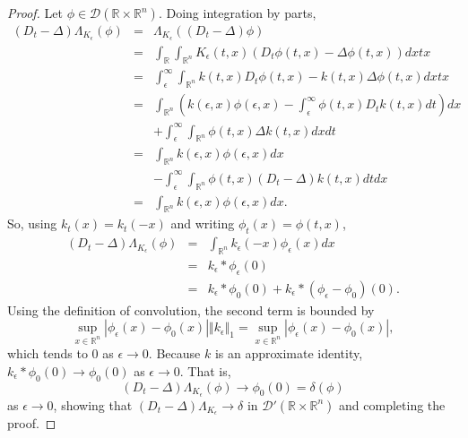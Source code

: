\documentclass{article}
\newcommand{\norm}[1]{\Vert #1 \Vert}
\begin{document}
\begin{proof}
Let $\phi \in \mathscr{D}(\mathbb{R} \times \mathbb{R}^n)$. Doing integration by parts,
\begin{eqnarray*}
(D_t-\Delta)\Lambda_{K_\epsilon}(\phi)&=&\Lambda_{K_\epsilon}\left( (D_t-\Delta) \phi\right)\\
&=&\int_{\mathbb{R}} \int_{\mathbb{R}^n} K_\epsilon(t,x)(D_t \phi(t,x) -\Delta \phi(t,x)) dxtx\\
&=&\int_\epsilon^\infty \int_{\mathbb{R}^n} k(t,x) D_t \phi(t,x) - k(t,x) \Delta \phi(t,x) dxtx\\
&=& \int_{\mathbb{R}^n} \left(k(\epsilon,x)\phi(\epsilon,x)- \int_\epsilon^\infty \phi(t,x) D_t k(t,x)  dt \right) dx  \\
&&+ \int_\epsilon^\infty \int_{\mathbb{R}^n}\phi(t,x) \Delta k(t,x) dx dt\\
&=&\int_{\mathbb{R}^n} k(\epsilon,x)\phi(\epsilon,x) dx \\
&&-\int_\epsilon^\infty  \int_{\mathbb{R}^n} \phi(t,x) (D_t-\Delta)k(t,x) dt dx\\
&=&\int_{\mathbb{R}^n} k(\epsilon,x)\phi(\epsilon,x) dx.
\end{eqnarray*}
So, using $k_t(x)=k_t(-x)$ and writing $\phi_t(x)=\phi(t,x)$,
\begin{eqnarray*}
(D_t-\Delta)\Lambda_{K_\epsilon}(\phi)&=&\int_{\mathbb{R}^n} k_\epsilon(-x) \phi_\epsilon(x) dx\\
&=&k_\epsilon * \phi_\epsilon (0)\\
&=& k_\epsilon * \phi_0 (0) + k_\epsilon*(\phi_\epsilon-\phi_0)(0).
\end{eqnarray*}
Using the definition of convolution, the second term is bounded by
\[
\sup_{x \in \mathbb{R}^n} |\phi_\epsilon(x)-\phi_0(x)|  \norm{k_\epsilon}_1 = \sup_{x \in \mathbb{R}^n} |\phi_\epsilon(x)-\phi_0(x)|,
\]
which tends to $0$ as $\epsilon \to 0$. Because $k$ is an approximate identity, $k_\epsilon * \phi_0 (0) \to \phi_0(0)$ as $\epsilon \to 0$. 
That is,
\[
(D_t-\Delta)\Lambda_{K_\epsilon}(\phi) \to \phi_0(0) = \delta ( \phi)
\]
as $\epsilon \to 0$, showing that $(D_t-\Delta)\Lambda_{K_\epsilon} \to \delta$ in $\mathscr{D}'(\mathbb{R} \times \mathbb{R}^n)$ and completing the proof.
\end{proof}
\end{document}
